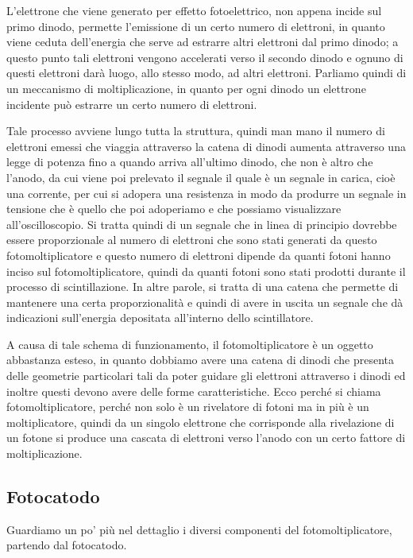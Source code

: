L'elettrone che viene generato per effetto fotoelettrico, non appena incide sul primo dinodo, permette l'emissione di un certo numero di elettroni, in quanto viene ceduta dell'energia che serve ad estrarre altri elettroni dal primo dinodo; a questo punto tali elettroni vengono accelerati verso il secondo dinodo e ognuno di questi elettroni darà luogo, allo stesso modo, ad altri elettroni. Parliamo quindi di un meccanismo di moltiplicazione, in quanto per ogni dinodo un elettrone incidente può estrarre un certo numero di elettroni.

Tale processo avviene lungo tutta la struttura, quindi man mano il numero di elettroni emessi che viaggia attraverso la catena di dinodi aumenta attraverso una legge di potenza fino a quando arriva all'ultimo dinodo, che non è altro che l'anodo, da cui viene poi prelevato il segnale il quale è un segnale in carica, cioè una corrente, per cui si adopera una resistenza in modo da produrre un segnale in tensione che è quello che poi adoperiamo e che possiamo visualizzare all'oscilloscopio. Si tratta quindi di un segnale che in linea di principio dovrebbe essere proporzionale al numero di elettroni che sono stati generati da questo fotomoltiplicatore e questo numero di elettroni dipende da quanti fotoni hanno inciso sul fotomoltiplicatore, quindi da quanti fotoni sono stati prodotti durante il processo di scintillazione. In altre parole, si tratta di una catena che permette di mantenere una certa proporzionalità e quindi di avere in uscita un segnale che dà indicazioni sull'energia depositata all'interno dello scintillatore.

A causa di tale schema di funzionamento, il fotomoltiplicatore è un oggetto abbastanza esteso, in quanto dobbiamo avere una catena di dinodi che presenta delle geometrie particolari tali da poter guidare gli elettroni attraverso i dinodi ed inoltre questi devono avere delle forme caratteristiche. Ecco perché si chiama fotomoltiplicatore, perché non solo è un rivelatore di fotoni ma in più è un moltiplicatore, quindi da un singolo elettrone che corrisponde alla rivelazione di un fotone si produce una cascata di elettroni verso l'anodo con un certo fattore di moltiplicazione.

\subsection{Fotocatodo}
Guardiamo un po' più nel dettaglio i diversi componenti del fotomoltiplicatore, partendo dal fotocatodo.


